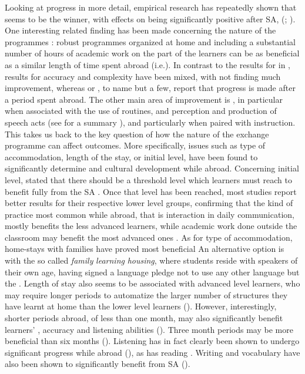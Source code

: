 \documentclass[output=paper]{langsci/langscibook}
\begin{document}
Looking at progress in more detail, empirical research has repeatedly shown that  seems to be the winner, with effects on  being significantly positive after SA, (\citealt{TowellEtAl1996};  \citealt{FreedEtAl2004,LlanesMuñoz2009,Valls-FerrerMora2014}). One interesting related finding has been made concerning the nature of the programmes \citep{Beattie2014}: robust  programmes organized at home and including a substantial number of hours of academic work on the part of the learners can be as beneficial as a similar length of time spent abroad (i.e.\citealt{FreedEtAl2004}). In contrast to the results for  in , results for  accuracy and complexity have been mixed, with \citet{DeKeyser1991} not finding much improvement, whereas \citet{Howard2005} or \citet{Juan-GarauEtAl2014}, to name but a few, report that progress is made after a period spent abroad. The other main area of improvement is , in particular when associated with the use of  routines, and perception and production of speech acts (see for a summary \citealt{Pérez-VidalShivelyforthcoming}), and particularly when paired with  instruction. This takes us back to the key question of how the nature of the exchange programme can affect  outcomes. More specifically, issues %
such as type of accommodation, length of the stay, or initial level, have been found to significantly determine  and cultural development while abroad. Concerning initial level, \citet{Collentine2009} stated that there should be a threshold level which learners must reach to benefit fully from the SA . Once that level has been reached, most studies report better results for their respective lower level groups, confirming that the kind of practice most common while abroad, that is interaction in daily communication, mostly benefits the less advanced learners, while academic work done outside the classroom may benefit the most advanced ones \citep{Kinginger2009}. As for type of accommodation, home-stays with families have proved most beneficial An alternative option is with the so called \textit{family} \textit{learning} \textit{housing}, where students reside with  speakers of their own age, having signed a language pledge not to use any other language but the  \citep{Kinginger2015}. Length of stay also seems to be associated with advanced level learners, who may require longer periods to automatize the larger number of structures they have learnt at home than the lower level learners (\citealt{DeKeyser2014}). However, interestingly, shorter periods abroad, of less than one month, may also significantly benefit  learners’ , accuracy and listening abilities (\citealt{LlanesMuñoz2009}). Three month periods may be more beneficial than six months (\citealt{LaraEtAl2015}). Listening has in fact clearly been shown to undergo significant progress while abroad (\citealt{BeattieEtAl2014}), as has reading \citep{Dewey2004}. Writing and vocabulary have also been shown to significantly benefit from SA (\citealt{Sasaki2007,Sasaki2011,Barquin2012,ZaytsevaEtAl2018}).
\end{document}
